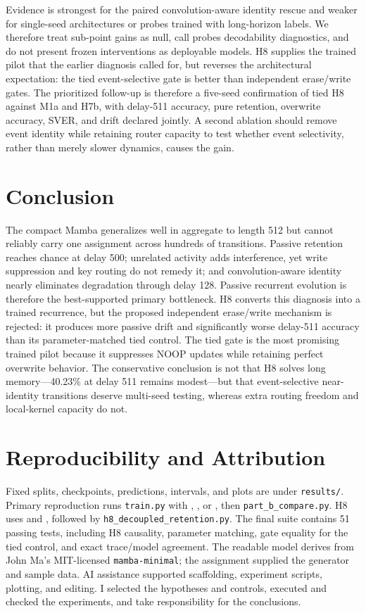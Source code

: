 \documentclass[10pt,a4paper]{article}
\begin{document}
Evidence is strongest for the paired convolution-aware identity rescue and weaker for single-seed architectures or probes trained with long-horizon labels. We therefore treat sub-point gains as null, call probes decodability diagnostics, and do not present frozen interventions as deployable models. H8 supplies the trained pilot that the earlier diagnosis called for, but reverses the architectural expectation: the tied event-selective gate is better than independent erase/write gates. The prioritized follow-up is therefore a five-seed confirmation of tied H8 against M1a and H7b, with delay-511 accuracy, pure retention, overwrite accuracy, SVER, and drift declared jointly. A second ablation should remove event identity while retaining router capacity to test whether event selectivity, rather than merely slower dynamics, causes the gain.

\section{Conclusion}
The compact Mamba generalizes well in aggregate to length 512 but cannot reliably carry one assignment across hundreds of transitions. Passive retention reaches chance at delay 500; unrelated activity adds interference, yet write suppression and key routing do not remedy it; and convolution-aware identity nearly eliminates degradation through delay 128. Passive recurrent evolution is therefore the best-supported primary bottleneck. H8 converts this diagnosis into a trained recurrence, but the proposed independent erase/write mechanism is rejected: it produces more passive drift and significantly worse delay-511 accuracy than its parameter-matched tied control. The tied gate is the most promising trained pilot because it suppresses NOOP updates while retaining perfect overwrite behavior. The conservative conclusion is not that H8 solves long memory---40.23\% at delay 511 remains modest---but that event-selective near-identity transitions deserve multi-seed testing, whereas extra routing freedom and local-kernel capacity do not.

\section{Reproducibility and Attribution}
Fixed splits, checkpoints, predictions, intervals, and plots are under \texttt{results/}. Primary reproduction runs \texttt{train.py} with , , or , then \texttt{part\_b\_compare.py}. H8 uses  and , followed by \texttt{h8\_decoupled\_retention.py}. The final suite contains 51 passing tests, including H8 causality, parameter matching, gate equality for the tied control, and exact trace/model agreement. The readable model derives from John Ma's MIT-licensed \texttt{mamba-minimal}; the assignment supplied the generator and sample data. AI assistance supported scaffolding, experiment scripts, plotting, and editing. I selected the hypotheses and controls, executed and checked the experiments, and take responsibility for the conclusions.
\end{document}
